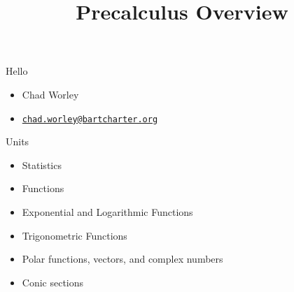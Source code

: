 \documentclass[
  ignorenonframetext,
]{beamer}
\title{Precalculus Overview}
\author{}
\date{\vspace{-2.5em}}
\providecommand{\tightlist}{%
  \setlength{\itemsep}{0pt}\setlength{\parskip}{0pt}}
\begin{document}
\frame{\titlepage}

\begin{frame}{Hello}
\protect\hypertarget{hello}{}
\begin{itemize}
\tightlist
\item
  Chad Worley
\item
  \href{mailto:chad.worley@bartcharter.org}{\nolinkurl{chad.worley@bartcharter.org}}
\end{itemize}
\end{frame}

\begin{frame}{Units}
\protect\hypertarget{units}{}
\begin{itemize}
\tightlist
\item
  Statistics
\item
  Functions
\item
  Exponential and Logarithmic Functions
\item
  Trigonometric Functions
\item
  Polar functions, vectors, and complex numbers
\item
  Conic sections
\end{itemize}
\end{frame}
\end{document}
